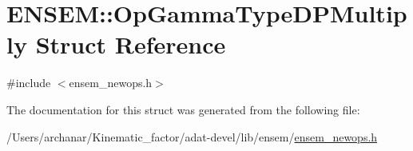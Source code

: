 \hypertarget{structENSEM_1_1OpGammaTypeDPMultiply}{}\section{E\+N\+S\+EM\+:\+:Op\+Gamma\+Type\+D\+P\+Multiply Struct Reference}
\label{structENSEM_1_1OpGammaTypeDPMultiply}


{\ttfamily \#include $<$ensem\+\_\+newops.\+h$>$}



The documentation for this struct was generated from the following file\+:\begin{DoxyCompactItemize}
\item 
/\+Users/archanar/\+Kinematic\+\_\+factor/adat-\/devel/lib/ensem/\mbox{\hyperlink{adat-devel_2lib_2ensem_2ensem__newops_8h}{ensem\+\_\+newops.\+h}}\end{DoxyCompactItemize}
